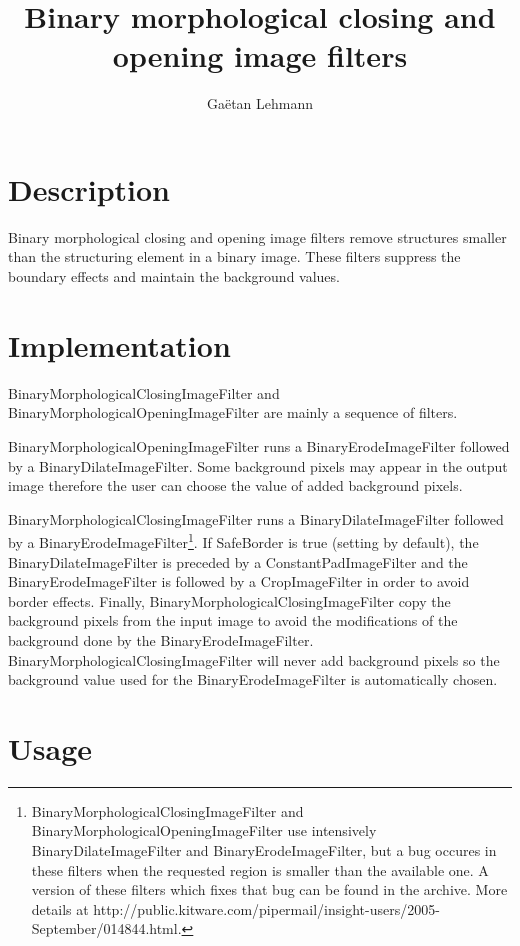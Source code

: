 \documentclass[IJ]{cesj}
\author{Ga\"etan Lehmann}
\institute{Biologie du d\'eveloppement et de la reproduction, INRA de Jouy-en-Josas}
\title{Binary morphological closing and opening image filters}
\begin{document}
\lstset{language=c++}
\maketitle

\section{Description}

Binary morphological closing and opening image filters remove structures smaller than the structuring element in a binary image. These filters suppress the boundary effects and maintain the background values.

\section{Implementation}

BinaryMorphologicalClosingImageFilter and BinaryMorphologicalOpeningImageFilter are mainly a sequence of filters.

BinaryMorphologicalOpeningImageFilter runs a BinaryErodeImageFilter followed by a BinaryDilateImageFilter. Some background pixels may appear in the output image therefore the user can choose the value of added background pixels.

BinaryMorphologicalClosingImageFilter runs a BinaryDilateImageFilter followed by a BinaryErodeImageFilter\footnote{BinaryMorphologicalClosingImageFilter and BinaryMorphologicalOpeningImageFilter use intensively BinaryDilateImageFilter and BinaryErodeImageFilter, but a bug occures in these filters when the requested region is smaller than the available one. A version of these filters which fixes that bug can be found in the archive. More details at http://public.kitware.com/pipermail/insight-users/2005-September/014844.html.}. If SafeBorder is true (setting by default), the BinaryDilateImageFilter is preceded by a ConstantPadImageFilter and the BinaryErodeImageFilter is followed by a CropImageFilter in order to avoid border effects. Finally, BinaryMorphologicalClosingImageFilter copy the background pixels from the input image to avoid the modifications of the background done by the BinaryErodeImageFilter. BinaryMorphologicalClosingImageFilter will never add background pixels so the background value used for the BinaryErodeImageFilter is automatically chosen.

\section{Usage}
\end{document}
